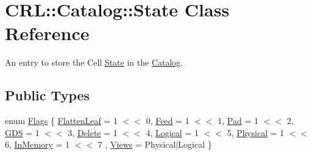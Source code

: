 \hypertarget{classCRL_1_1Catalog_1_1State}{}\section{C\+RL\+:\+:Catalog\+:\+:State Class Reference}
\label{classCRL_1_1Catalog_1_1State}


An entry to store the Cell \mbox{\hyperlink{classCRL_1_1Catalog_1_1State}{State}} in the \mbox{\hyperlink{classCRL_1_1Catalog}{Catalog}}.  


\subsection*{Public Types}
\begin{DoxyCompactItemize}
\item 
enum \mbox{\hyperlink{classCRL_1_1Catalog_1_1State_a625003526d38ac7500b4ad7de35e2d74}{Flags}} \{ \newline
\mbox{\hyperlink{classCRL_1_1Catalog_1_1State_a625003526d38ac7500b4ad7de35e2d74a496651784f48e1dc9690ff484f90477c}{Flatten\+Leaf}} = 1 $<$$<$ 0, 
\newline
\mbox{\hyperlink{classCRL_1_1Catalog_1_1State_a625003526d38ac7500b4ad7de35e2d74a2b7599c1303429830c8d3e6b673b3cb1}{Feed}} = 1 $<$$<$ 1, 
\newline
\mbox{\hyperlink{classCRL_1_1Catalog_1_1State_a625003526d38ac7500b4ad7de35e2d74a2e2b8b775bb6e8d8d12500426a01e38b}{Pad}} = 1 $<$$<$ 2, 
\newline
\mbox{\hyperlink{classCRL_1_1Catalog_1_1State_a625003526d38ac7500b4ad7de35e2d74a98da2efe9c180f68f009836d1179cc4a}{G\+DS}} = 1 $<$$<$ 3, 
\newline
\mbox{\hyperlink{classCRL_1_1Catalog_1_1State_a625003526d38ac7500b4ad7de35e2d74ae8f1bee3750e1fa0c1d8097a28ee49da}{Delete}} = 1 $<$$<$ 4, 
\newline
\mbox{\hyperlink{classCRL_1_1Catalog_1_1State_a625003526d38ac7500b4ad7de35e2d74a39170df01b13e1845db6eef82cc41b33}{Logical}} = 1 $<$$<$ 5, 
\newline
\mbox{\hyperlink{classCRL_1_1Catalog_1_1State_a625003526d38ac7500b4ad7de35e2d74ae166fbe3aa47f42ea93b2624b2ffed7d}{Physical}} = 1 $<$$<$ 6, 
\newline
\mbox{\hyperlink{classCRL_1_1Catalog_1_1State_a625003526d38ac7500b4ad7de35e2d74a1f8f15ecd43109bcc463970d8acc03fd}{In\+Memory}} = 1 $<$$<$ 7
, \newline
\mbox{\hyperlink{classCRL_1_1Catalog_1_1State_a625003526d38ac7500b4ad7de35e2d74a6b88bbc27f9989a35a1e00772e157b35}{Views}} = Physical$\vert$\+Logical
 \}
\end{DoxyCompactItemize}
